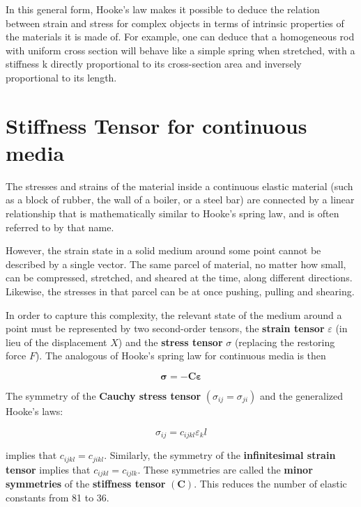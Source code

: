 In this general form, Hooke's law makes it possible to deduce the relation between strain and stress for complex objects in terms of intrinsic properties of the materials it is made of. For example, one can deduce that a homogeneous rod with uniform cross section will behave like a simple spring when stretched, with a stiffness k directly proportional to its cross-section area and inversely proportional to its length.

\section{Stiffness Tensor for continuous media}
The stresses and strains of the material inside a continuous elastic material (such as a block of rubber, the wall of a boiler, or a steel bar) are connected by a linear relationship that is mathematically similar to Hooke's spring law, and is often referred to by that name.

However, the strain state in a solid medium around some point cannot be described by a single vector. The same parcel of material, no matter how small, can be compressed, stretched, and sheared at the time, along different directions. Likewise, the stresses in that parcel can be at once pushing, pulling and shearing.

In order to capture this complexity, the relevant state of the medium around a point must be represented by two second-order tensors, the \textbf{strain tensor} $ \varepsilon $ (in lieu of the displacement $ X $) and the \textbf{stress tensor} $ \sigma $ (replacing the restoring force $ F $). The analogous of Hooke's spring law for continuous media is then

\begin{equation}
\mathbf{\sigma} = -\mathbf{C} \mathbf{\varepsilon}
\end{equation}

The symmetry of the \textbf{Cauchy stress tensor} $ (\sigma_{ij} = \sigma_{ji}) $ and the generalized Hooke's laws:

\begin{equation}
\sigma_{ij} = c_{ijkl} \varepsilon_kl
\end{equation}

implies that $ c_{ijkl} = c_{jikl} $. Similarly, the symmetry of the \textbf{infinitesimal strain tensor} implies that $ c_{ijkl} = c_{ijlk} $. These symmetries are called the \textbf{minor symmetries} of the \textbf{stiffness tensor} $ (\mathbf{C}) $. This reduces the number of elastic constants from 81 to 36.

